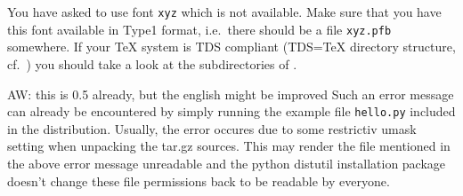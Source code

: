\documentclass[11pt,DIV14]{scrartcl}
\begin{document}
{}
{\label{q:fontshape_undefined}
You have asked to use font \texttt{xyz} which is not available. Make sure that
you have this font available in Type1 format, i.e.\ there should be a 
file \texttt{xyz.pfb} somewhere. If your \TeX{} system is TDS compliant 
(TDS=\TeX{} directory structure, cf.\ ) 
you should take a look at the subdirectories of 
.
}

{AW: this is 0.5 already, but the english might be improved}
{\label{q:no_lfs}
Such an error message can already be encountered by simply running the
example file \texttt{hello.py} included in the \PyX{} distribution.
Usually, the error occures due to some restrictiv umask setting when
unpacking the tar.gz sources. This may render the file mentioned in
the above error message unreadable and the python distutil
installation package doesn't change these file permissions back to be
readable by everyone.}
\end{document}
